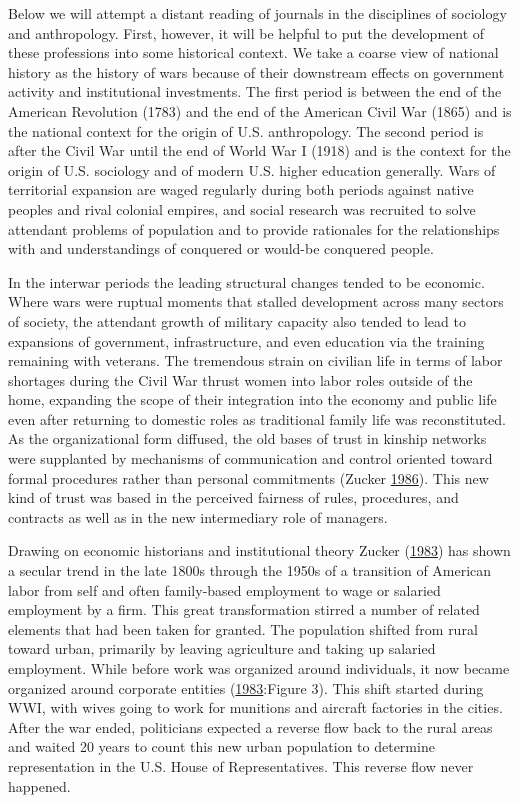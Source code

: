 \documentclass[]{book}
\theoremstyle{definition}
\theoremstyle{definition}
\theoremstyle{definition}
\theoremstyle{remark}
\begin{document}
Below we will attempt a distant reading of journals in the disciplines
of sociology and anthropology. First, however, it will be helpful to put
the development of these professions into some historical context. We
take a coarse view of national history as the history of wars because of
their downstream effects on government activity and institutional
investments. The first period is between the end of the American
Revolution (1783) and the end of the American Civil War (1865) and is
the national context for the origin of U.S. anthropology. The second
period is after the Civil War until the end of World War I (1918) and is
the context for the origin of U.S. sociology and of modern U.S. higher
education generally. Wars of territorial expansion are waged regularly
during both periods against native peoples and rival colonial empires,
and social research was recruited to solve attendant problems of
population and to provide rationales for the relationships with and
understandings of conquered or would-be conquered people.

In the interwar periods the leading structural changes tended to be
economic. Where wars were ruptual moments that stalled development
across many sectors of society, the attendant growth of military
capacity also tended to lead to expansions of government,
infrastructure, and even education via the training remaining with
veterans. The tremendous strain on civilian life in terms of labor
shortages during the Civil War thrust women into labor roles outside of
the home, expanding the scope of their integration into the economy and
public life even after returning to domestic roles as traditional family
life was reconstituted. As the organizational form diffused, the old
bases of trust in kinship networks were supplanted by mechanisms of
communication and control oriented toward formal procedures rather than
personal commitments (Zucker
\protect\hyperlink{ref-Zucker1986Production}{1986}). This new kind of
trust was based in the perceived fairness of rules, procedures, and
contracts as well as in the new intermediary role of managers.

Drawing on economic historians and institutional theory Zucker
(\protect\hyperlink{ref-Zucker1983Organizations}{1983}) has shown a
secular trend in the late 1800s through the 1950s of a transition of
American labor from self and often family-based employment to wage or
salaried employment by a firm. This great transformation stirred a
number of related elements that had been taken for granted. The
population shifted from rural toward urban, primarily by leaving
agriculture and taking up salaried employment. While before work was
organized around individuals, it now became organized around corporate
entities (\protect\hyperlink{ref-Zucker1983Organizations}{1983}:Figure
3). This shift started during WWI, with wives going to work for
munitions and aircraft factories in the cities. After the war ended,
politicians expected a reverse flow back to the rural areas and waited
20 years to count this new urban population to determine representation
in the U.S. House of Representatives. This reverse flow never happened.
\end{document}
